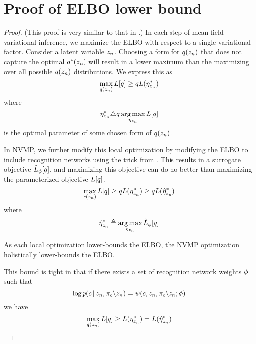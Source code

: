 \section{Proof of ELBO lower bound}
\label{sec:nvmp-proof}

\begin{proof}
(This proof is very similar to that in \citet{Johnson2016}.)
In each step of mean-field variational inference,
we maximize the ELBO with respect to a single variational factor.
Consider a latent variable $z_n$.
Choosing a form for $q(z_n)$
that does not capture the optimal $q^*(z_n)$
will result
in a lower maximum than the maximizing
over all possible $q(z_n)$ distributions.
We express this as
\begin{equation}
    \max_{q(z_n)}L[q] \ge q  L(\eta_{z_n}^*)
\end{equation}
where 
\[
\eta_{z_n}^* \triangle q \operatorname*{arg\,max}_{\eta_{z_n}} L[q]
\]
is the optimal parameter of some chosen form of $q(z_n)$.

In NVMP, we further modify this local optimization
by modifying the ELBO to include recognition networks
using the trick from \cite{Johnson2016}.
This results in a surrogate objective $\hat{L}_\phi[q]$,
and maximizing this objective can do no better than maximizing the
parameterized objective $L[q]$.
\begin{equation}
    \max_{q(z_n)}L[q] \ge q  L(\eta_{z_n}^*) \ge q
    L(\hat{\eta}_{z_n}^*)
\end{equation}
where 
\[
\hat{\eta}_{z_n}^* \triangleq \operatorname*{arg\,max}_{\eta_{z_n}} \hat{L}_\phi[q]
\]

As each local optimization lower-bounds the ELBO,
the NVMP optimization holistically 
lower-bounds the ELBO.

This bound is tight in that
if there exists a set of recognition
network weights $\phi$ such that
\begin{equation}
\log p(c \,|\, z_n, \pi_c \backslash z_n) = \psi(c, z_n, \pi_{c} \backslash z_n; \phi) \\
\end{equation}
we have
\begin{equation}
    \max_{q(z_n)}L[q] \geq  L(\eta_{z_n}^*) = 
    L(\hat{\eta}_{z_n}^*)
\end{equation}
\end{proof}

